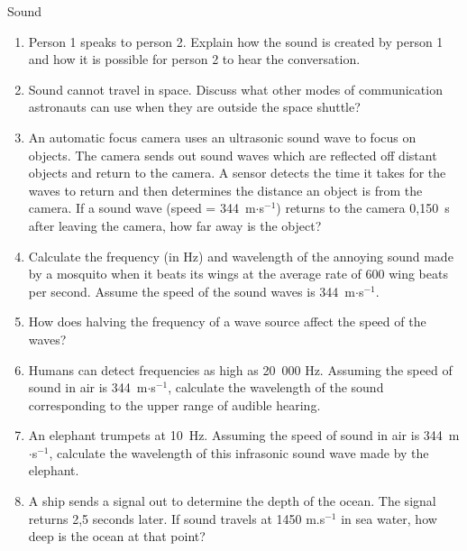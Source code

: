 \begin{eocexercises}{Sound}
\begin{enumerate}[noitemsep, label=\textbf{\arabic*}. ]
\label{m38800*uid96}\item Person 1 speaks to person 2. Explain how the sound is created by person 1 and how it is possible for person 2 to hear the conversation.\newline
\label{m38800*uid97}\item Sound cannot travel in space. Discuss what other modes of communication astronauts can use when they are outside the space shuttle?\newline
\label{m38800*uid98}\item An automatic focus camera uses an ultrasonic sound wave to focus on objects. The camera sends out sound waves which are reflected off distant objects and return to the camera. A sensor detects the time it takes for the waves to return and then determines the distance an object is from the camera. If a sound wave (speed = 344~m$\ensuremath{\cdot}$s${}^{-1}$) returns to the camera 0,150~s after leaving the camera, how far away is the object?\newline
\label{m38800*uid99}\item Calculate the frequency (in Hz) and wavelength of the annoying sound made by a mosquito when it beats its wings at the average rate of 600 wing beats per second. Assume the speed of the sound waves is 344~m$\ensuremath{\cdot}$s${}^{-1}$.        
\label{m38800*uid100}\item How does halving the frequency of a wave source affect the speed of the waves?\newline
\label{m38800*uid101}\item Humans can detect frequencies as high as 20~000 Hz. Assuming the speed of sound in air is 344~m$\ensuremath{\cdot}$s${}^{-1}$, calculate the wavelength of the sound corresponding to the upper range of audible hearing.\newline
\label{m38800*uid102}\item An elephant trumpets at 10~Hz. Assuming the speed of sound in air is 344~m$\ensuremath{\cdot}$s${}^{-1}$, calculate the wavelength of this infrasonic sound wave made by the elephant.\newline
\label{m38800*uid103}\item A ship sends a signal out to determine the depth of the ocean. The signal returns 2,5 seconds later. If sound travels at
1450 m.s${}^{-1}$ in sea water, how deep is the ocean at that point?\newline

\end{enumerate}
\end{eocexercises}
